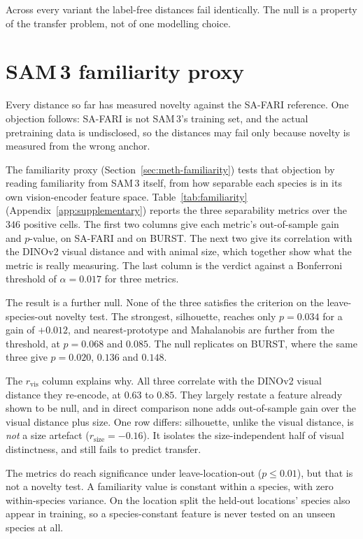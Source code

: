 Across every variant the label-free distances fail identically. The null is a property of the transfer
problem, not of one modelling choice.

\section{SAM\,3 familiarity proxy}
\label{sec:familiarity}
Every distance so far has measured novelty against the SA-FARI reference. One objection follows: SA-FARI is
not SAM\,3's training set, and the actual pretraining data is undisclosed, so the distances may fail only
because novelty is measured from the wrong anchor.

The familiarity proxy (Section~\ref{sec:meth-familiarity}) tests that objection by reading familiarity from
SAM\,3 itself, from how separable each species is in its own vision-encoder feature space.
Table~\ref{tab:familiarity} (Appendix~\ref{app:supplementary}) reports the three separability metrics over
the $346$ positive cells. The first two
columns give each metric's out-of-sample gain and $p$-value, on SA-FARI and on BURST. The next two give its
correlation with the DINOv2 visual distance and with animal size, which together show what the metric is really
measuring. The last column is the verdict against a Bonferroni threshold of $\alpha=0.017$ for three metrics.

The result is a further null. None of the three satisfies the criterion on the leave-species-out novelty
test. The strongest, silhouette, reaches only $p=0.034$ for a gain of $+0.012$, and nearest-prototype and
Mahalanobis are further from the threshold, at $p=0.068$ and $0.085$. The null replicates on BURST, where the same three give $p=0.020$,
$0.136$ and $0.148$.

The $r_\text{vis}$ column explains why. All three correlate with the DINOv2 visual distance they re-encode, at
$0.63$ to $0.85$. They largely restate a feature already shown to be null, and in direct comparison none adds
out-of-sample gain over the visual distance plus size. One row differs: silhouette, unlike the
visual distance, is \emph{not} a size artefact ($r_\text{size}=-0.16$). It isolates the size-independent half of
visual distinctness, and still fails to predict transfer.

The metrics do reach significance under leave-location-out ($p\le0.01$), but that is not a novelty test. A
familiarity value is constant within a species, with zero within-species variance. On the location split the
held-out locations' species also appear in training, so a species-constant feature is never tested on an unseen
species at all.

